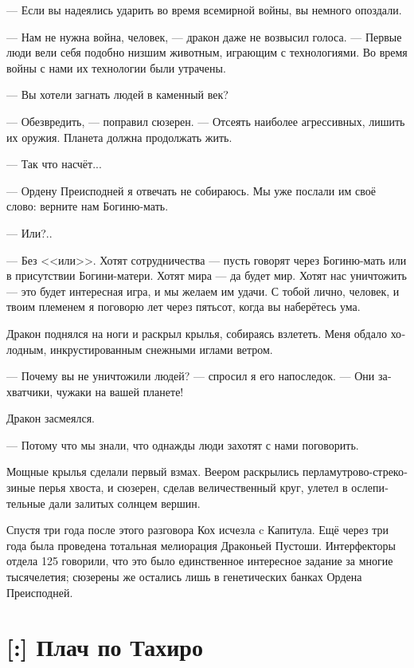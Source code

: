 \documentclass[a4paper,12pt,fleqn]{book}\usepackage{polyglossia}\setdefaultlanguage[babelshorthands=true]{russian}\setotherlanguage{english}\defaultfontfeatures{Ligatures=TeX,Mapping=tex-text}\usepackage{xcolor}\newcommand{\ml}[3]{#2}
\newcommand{\asterism}{\vspace{1em}{\centering\Large\bfseries$\ast~\ast~\ast$\par}\vspace{1em}}
\newcommand{\textspace}{\vspace{1em}{\centering\Large\bfseries<...>\par}\vspace{1em}}
\begin{document}
--- Если вы надеялись ударить во время всемирной войны, вы немного опоздали.

--- Нам не нужна война, человек, --- дракон даже не возвысил голоса.
--- Первые люди вели себя подобно низшим животным, играющим с технологиями.
Во время войны с нами их технологии были утрачены.

--- Вы хотели загнать людей в каменный век?

--- Обезвредить, --- поправил сюзерен.
--- Отсеять наиболее агрессивных, лишить их оружия.
Планета должна продолжать жить.

--- Так что насчёт...

--- Ордену Преисподней я отвечать не собираюсь.
Мы уже послали им своё слово: верните нам Богиню-мать.

--- Или?..

--- Без <<или>>.
Хотят сотрудничества --- пусть говорят через Богиню-мать или в присутствии Богини-матери.
Хотят мира --- да будет мир.
Хотят нас уничтожить --- это будет интересная игра, и мы желаем им удачи.
С тобой лично, человек, и твоим племенем я поговорю лет через пятьсот, когда вы наберётесь ума.

Дракон поднялся на ноги и раскрыл крылья, собираясь взлететь.
Меня обдало холодным, инкрустированным снежными иглами ветром.

--- Почему вы не уничтожили людей? --- спросил я его напоследок.
--- Они захватчики, чужаки на вашей планете!

Дракон засмеялся.

--- Потому что мы знали, что однажды люди захотят с нами поговорить.

Мощные крылья сделали первый взмах.
Веером раскрылись перламутрово-стрекозиные перья хвоста, и сюзерен, сделав величественный круг, улетел в ослепительные дали залитых солнцем вершин.

\asterism

Спустя три года после этого разговора Кох исчезла c Капитула.
Ещё через три года была проведена тотальная мелиорация Драконьей Пустоши.
Интерфекторы отдела 125 говорили, что это было единственное интересное задание за многие тысячелетия;
сюзерены же остались лишь в генетических банках Ордена Преисподней.

\section{[:] Плач по Тахиро}

\textspace
\end{document}
